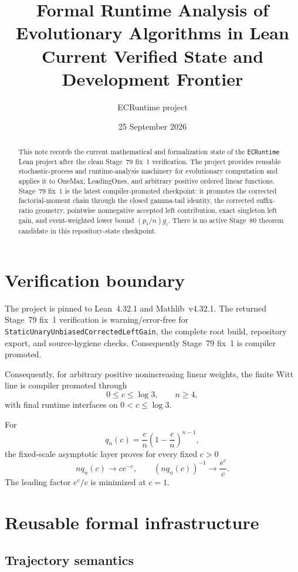 \documentclass[11pt]{article}
\title{Formal Runtime Analysis of Evolutionary Algorithms in Lean\\
\large Current Verified State and Development Frontier}
\author{ECRuntime project}
\date{25 September 2026}
\begin{document}
\maketitle

\begin{abstract}
This note records the current mathematical and formalization state of the
\texttt{ECRuntime} Lean project after the clean Stage~79 fix~1 verification. The project
provides reusable stochastic-process and runtime-analysis machinery for evolutionary
computation and applies it to OneMax, LeadingOnes, and arbitrary positive ordered linear
functions. Stage~79 fix~1 is the latest compiler-promoted checkpoint: it promotes the
corrected factorial-moment chain through the closed gamma-tail identity, the corrected
suffix-ratio geometry, pointwise nonnegative accepted left contribution, exact singleton
left gain, and event-weighted lower bound $(p_1/n)g_i$. There is no active Stage~80
theorem candidate in this repository-state checkpoint.
\end{abstract}

\section{Verification boundary}

The project is pinned to Lean~4.32.1 and Mathlib~v4.32.1. The returned Stage~79 fix~1 verification is warning/error-free for \texttt{StaticUnaryUnbiasedCorrectedLeftGain}, the complete root build, repository export, and source-hygiene checks. Consequently Stage~79 fix~1 is compiler promoted.

Consequently, for arbitrary positive nonincreasing linear weights, the finite Witt line
is compiler promoted through
\[
  0\le c\le\log 3,\qquad n\ge4,
\]
with final runtime interfaces on $0<c\le\log3$.

For
\[
  q_n(c)=\frac{c}{n}\left(1-\frac{c}{n}\right)^{n-1},
\]
the fixed-scale asymptotic layer proves for every fixed $c>0$
\[
  n q_n(c)\longrightarrow c e^{-c},
  \qquad
  (nq_n(c))^{-1}\longrightarrow \frac{e^c}{c}.
\]
The leading factor $e^c/c$ is minimized at $c=1$.

\section{Reusable formal infrastructure}

\subsection{Trajectory semantics}
\end{document}
